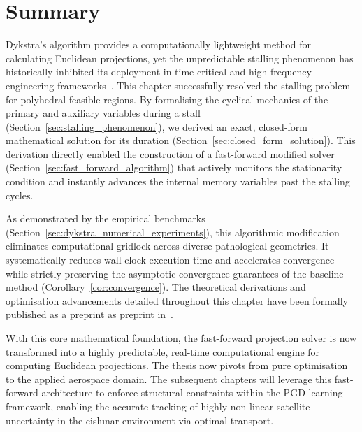 \section{Summary} \label{sec:dykstra_summary}

Dykstra's algorithm provides a computationally lightweight method for calculating Euclidean projections, yet the unpredictable stalling phenomenon has historically inhibited its deployment in time-critical and high-frequency engineering frameworks~\cite{DYKSTRASTALLING}. This chapter successfully resolved the stalling problem for polyhedral feasible regions. By formalising the cyclical mechanics of the primary and auxiliary variables during a stall (Section~\ref{sec:stalling_phenomenon}), we derived an exact, closed-form mathematical solution for its duration (Section~\ref{sec:closed_form_solution}). This derivation directly enabled the construction of a fast-forward modified solver (Section~\ref{sec:fast_forward_algorithm}) that actively monitors the stationarity condition and instantly advances the internal memory variables past the stalling cycles.

As demonstrated by the empirical benchmarks (Section~\ref{sec:dykstra_numerical_experiments}), this algorithmic modification eliminates computational gridlock across diverse pathological geometries. It systematically reduces wall-clock execution time and accelerates convergence while strictly preserving the asymptotic convergence guarantees of the baseline method (Corollary~\ref{cor:convergence}). The theoretical derivations and optimisation advancements detailed throughout this chapter have been formally published as a preprint as preprint in~\cite{Vestini2025}.

With this core mathematical foundation, the fast-forward projection solver is now transformed into a highly predictable, real-time computational engine for computing Euclidean projections. The thesis now pivots from pure optimisation to the applied aerospace domain. The subsequent chapters will leverage this fast-forward architecture to enforce structural constraints within the PGD learning framework, enabling the accurate tracking of highly non-linear satellite uncertainty in the cislunar environment via optimal transport.
